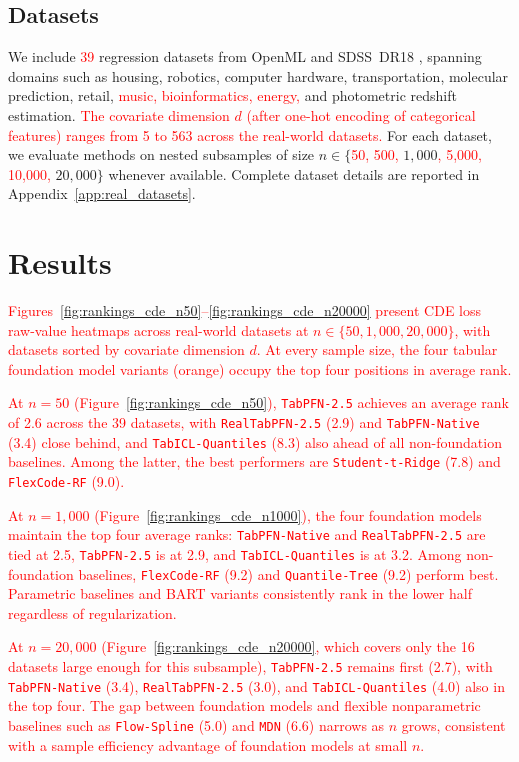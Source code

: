\documentclass{article}
\newcommand{\method}[1]{\texttt{#1}}
\begin{document}
\subsection{Datasets}
\label{sec:datasets}

We include \textcolor{red}{39} regression datasets from OpenML and SDSS~DR18
\citep{sdss_dr18}, spanning domains such as housing, robotics, computer
hardware, transportation, molecular prediction, retail, \textcolor{red}{music, bioinformatics, energy,} and photometric
redshift estimation. \textcolor{red}{The covariate dimension $d$ (after one-hot encoding of categorical features) ranges from 5 to 563 across the real-world datasets.}
For each dataset, we evaluate methods on nested subsamples
of size $n \in \{$\textcolor{red}{50, 500,} $1{,}000$\textcolor{red}{, 5{,}000, 10{,}000,} $20{,}000\}$ whenever
available. Complete dataset details are reported in
Appendix~\ref{app:real_datasets}.


\section{Results}
\label{sec:results}

\textcolor{red}{Figures~\ref{fig:rankings_cde_n50}--\ref{fig:rankings_cde_n20000} present CDE loss raw-value heatmaps across real-world datasets at $n \in \{50, 1{,}000, 20{,}000\}$, with datasets sorted by covariate dimension $d$.
At every sample size, the four tabular foundation model variants (orange) occupy the top four positions in average rank.}

\textcolor{red}{At $n=50$ (Figure~\ref{fig:rankings_cde_n50}), \method{TabPFN-2.5} achieves an average rank of 2.6 across the 39 datasets, with \method{RealTabPFN-2.5} (2.9) and \method{TabPFN-Native} (3.4) close behind, and \method{TabICL-Quantiles} (8.3) also ahead of all non-foundation baselines.
Among the latter, the best performers are \method{Student-t-Ridge} (7.8) and \method{FlexCode-RF} (9.0).}

\textcolor{red}{At $n=1{,}000$ (Figure~\ref{fig:rankings_cde_n1000}), the four foundation models maintain the top four average ranks: \method{TabPFN-Native} and \method{RealTabPFN-2.5} are tied at 2.5, \method{TabPFN-2.5} is at 2.9, and \method{TabICL-Quantiles} is at 3.2.
Among non-foundation baselines, \method{FlexCode-RF} (9.2) and \method{Quantile-Tree} (9.2) perform best. Parametric baselines and BART variants consistently rank in the lower half regardless of regularization.}

\textcolor{red}{At $n=20{,}000$ (Figure~\ref{fig:rankings_cde_n20000}, which covers only the 16 datasets large enough for this subsample), \method{TabPFN-2.5} remains first (2.7), with \method{TabPFN-Native} (3.4), \method{RealTabPFN-2.5} (3.0), and \method{TabICL-Quantiles} (4.0) also in the top four.
The gap between foundation models and flexible nonparametric baselines such as \method{Flow-Spline} (5.0) and \method{MDN} (6.6) narrows as $n$ grows, consistent with a sample efficiency advantage of foundation models at small $n$.}
\end{document}
